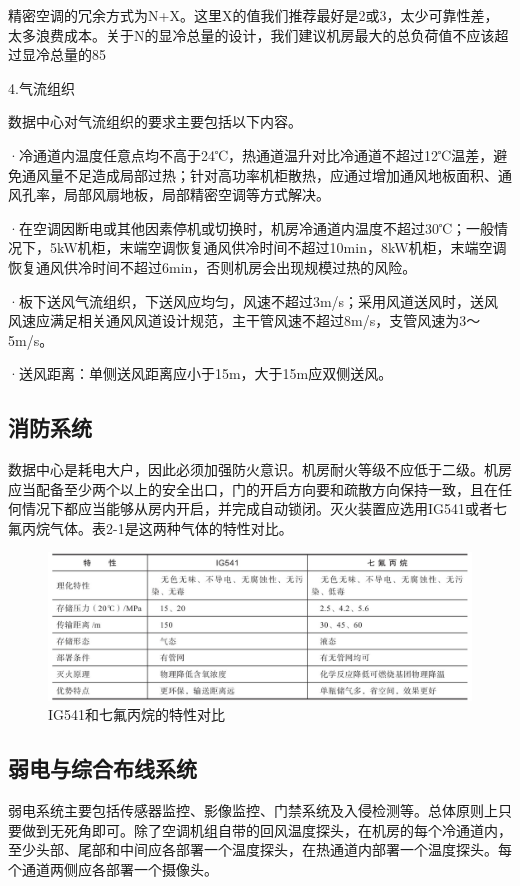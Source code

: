 \documentclass[12pt,UTF8]{ctexbook}
\begin{document}
精密空调的冗余方式为N+X。这里X的值我们推荐最好是2或3，太少可靠性差，太多浪费成本。关于N的显冷总量的设计，我们建议机房最大的总负荷值不应该超过显冷总量的85%

4.气流组织

数据中心对气流组织的要求主要包括以下内容。

·冷通道内温度任意点均不高于24℃，热通道温升对比冷通道不超过12℃温差，避免通风量不足造成局部过热；针对高功率机柜散热，应通过增加通风地板面积、通风孔率，局部风扇地板，局部精密空调等方式解决。

·在空调因断电或其他因素停机或切换时，机房冷通道内温度不超过30℃；一般情况下，5kW机柜，末端空调恢复通风供冷时间不超过10min，8kW机柜，末端空调恢复通风供冷时间不超过6min，否则机房会出现规模过热的风险。

·板下送风气流组织，下送风应均匀，风速不超过3m/s；采用风道送风时，送风风速应满足相关通风风道设计规范，主干管风速不超过8m/s，支管风速为3～5m/s。

·送风距离：单侧送风距离应小于15m，大于15m应双侧送风。

\subsection{消防系统}

数据中心是耗电大户，因此必须加强防火意识。机房耐火等级不应低于二级。机房应当配备至少两个以上的安全出口，门的开启方向要和疏散方向保持一致，且在任何情况下都应当能够从房内开启，并完成自动锁闭。灭火装置应选用IG541或者七氟丙烷气体。表2-1是这两种气体的特性对比。

\begin{figure}[htbp]
	\centering
	\includegraphics[width=1\linewidth]{4}
	\caption{IG541和七氟丙烷的特性对比}
	\label{fig:1}
\end{figure}

\subsection{弱电与综合布线系统}

弱电系统主要包括传感器监控、影像监控、门禁系统及入侵检测等。总体原则上只要做到无死角即可。除了空调机组自带的回风温度探头，在机房的每个冷通道内，至少头部、尾部和中间应各部署一个温度探头，在热通道内部署一个温度探头。每个通道两侧应各部署一个摄像头。
\end{document}
